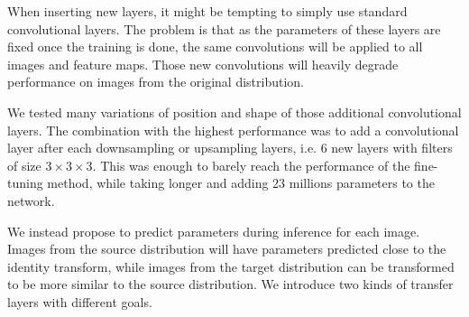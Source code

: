
When inserting new layers, it might be tempting to simply use standard convolutional layers. The problem is that as the parameters of these layers are fixed once the training is done, the same convolutions will be applied to all images and feature maps. Those new convolutions will heavily degrade performance on images from the original distribution. %

We tested many variations of position and shape of those additional convolutional layers. The combination with the highest performance was to add a convolutional layer after each downsampling or upsampling layers, i.e. 6 new layers with filters of size $3 \times 3 \times 3$. This was enough to barely reach the performance of the fine-tuning method, while taking longer and adding 23 millions parameters to the network. 

We instead propose to predict parameters during inference for each image. Images from the source distribution will have parameters predicted close to the identity transform, while images from the target distribution can be transformed to be more similar to the source distribution. We introduce two kinds of transfer layers with different goals.


